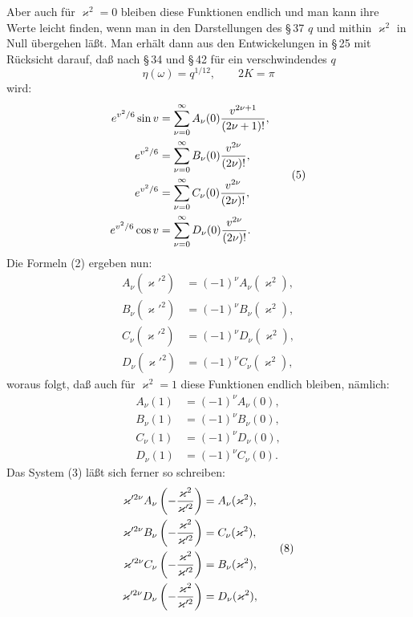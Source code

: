 \documentclass[11pt]{article}
\begin{document}
Aber auch für $\varkappa^2=0$ bleiben diese Funktionen endlich und man kann ihre Werte leicht finden, wenn man in den Darstellungen des \S\,37 $q$ und mithin $\varkappa^2$ in Null übergehen läßt. Man erhält dann aus den Entwickelungen in \S\,25 mit Rücksicht darauf, daß nach \S\,34 und \S\,42 für ein verschwindendes $q$
\[
\eta(\omega)=q^{1/12},
\qquad
2K=\pi
\]
wird:
\begin{equation}
\begin{aligned}
e^{v^2/6}\sin v&=\sum_{\nu=0}^{\infty}A_\nu(0){v^{2\nu+1}\over(2\nu+1)!},\\
e^{v^2/6}&=\sum_{\nu=0}^{\infty}B_\nu(0){v^{2\nu}\over(2\nu)!},\\
e^{v^2/6}&=\sum_{\nu=0}^{\infty}C_\nu(0){v^{2\nu}\over(2\nu)!},\\
e^{v^2/6}\cos v&=\sum_{\nu=0}^{\infty}D_\nu(0){v^{2\nu}\over(2\nu)!}.
\end{aligned}
\tag{5}
\end{equation}
Die Formeln (2) ergeben nun:
\begin{equation}
\begin{aligned}
A_\nu(\varkappa'^2)&=(-1)^\nu A_\nu(\varkappa^2),\\
B_\nu(\varkappa'^2)&=(-1)^\nu B_\nu(\varkappa^2),\\
C_\nu(\varkappa'^2)&=(-1)^\nu D_\nu(\varkappa^2),\\
D_\nu(\varkappa'^2)&=(-1)^\nu C_\nu(\varkappa^2),
\end{aligned}
\tag{6}
\end{equation}
woraus folgt, daß auch für $\varkappa^2=1$ diese Funktionen endlich bleiben, nämlich:
\begin{equation}
\begin{aligned}
A_\nu(1)&=(-1)^\nu A_\nu(0),\\
B_\nu(1)&=(-1)^\nu B_\nu(0),\\
C_\nu(1)&=(-1)^\nu D_\nu(0),\\
D_\nu(1)&=(-1)^\nu C_\nu(0).
\end{aligned}
\tag{7}
\end{equation}
Das System (3) läßt sich ferner so schreiben:
\begin{equation}
\begin{aligned}
\varkappa'^{2\nu}A_\nu\left(-{\varkappa^2\over\varkappa'^2}\right)&=A_\nu(\varkappa^2),\\
\varkappa'^{2\nu}B_\nu\left(-{\varkappa^2\over\varkappa'^2}\right)&=C_\nu(\varkappa^2),\\
\varkappa'^{2\nu}C_\nu\left(-{\varkappa^2\over\varkappa'^2}\right)&=B_\nu(\varkappa^2),\\
\varkappa'^{2\nu}D_\nu\left(-{\varkappa^2\over\varkappa'^2}\right)&=D_\nu(\varkappa^2),
\end{aligned}
\tag{8}
\end{equation}
\end{document}
